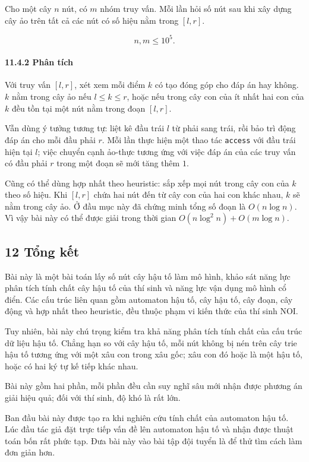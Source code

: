 \documentclass[11pt]{article}
\begin{document}
Cho một cây \(n\) nút, có \(m\) nhóm truy vấn. Mỗi lần hỏi số nút sau khi xây
dựng cây ảo trên tất cả các nút có số hiệu nằm trong \([l,r]\).

\[
  n,m\le 10^5 .
\]

\paragraph{11.4.2 Phân tích}

Với truy vấn \([l,r]\), xét xem mỗi điểm \(k\) có tạo đóng góp cho đáp án hay
không. \(k\) nằm trong cây ảo nếu \(l\le k\le r\), hoặc nếu trong cây con của ít
nhất hai con của \(k\) đều tồn tại một nút nằm trong đoạn \([l,r]\).

Vẫn dùng ý tưởng tương tự: liệt kê đầu trái \(l\) từ phải sang trái, rồi bảo trì
động đáp án cho mỗi đầu phải \(r\). Mỗi lần thực hiện một thao tác
\texttt{access} với đầu trái hiện tại \(l\); việc chuyển cạnh ảo-thực tương ứng
với việc đáp án của các truy vấn có đầu phải \(r\) trong một đoạn sẽ mới tăng
thêm \(1\).

Cũng có thể dùng hợp nhất theo heuristic: sắp xếp mọi nút trong cây con của
\(k\) theo số hiệu. Khi \([l,r]\) chứa hai nút đến từ cây con của hai con khác
nhau, \(k\) sẽ nằm trong cây ảo. Ở đầu mục này đã chứng minh tổng số đoạn là
\(O(n\log n)\). Vì vậy bài này có thể được giải trong thời gian
\(O(n\log^2 n)+O(m\log n)\).

\subsection*{12 Tổng kết}

Bài này là một bài toán lấy số nút cây hậu tố làm mô hình, khảo sát năng lực
phân tích tính chất cây hậu tố của thí sinh và năng lực vận dụng mô hình cổ
điển. Các cấu trúc liên quan gồm automaton hậu tố, cây hậu tố, cây đoạn, cây
động và hợp nhất theo heuristic, đều thuộc phạm vi kiến thức của thí sinh NOI.

Tuy nhiên, bài này chú trọng kiểm tra khả năng phân tích tính chất của cấu trúc
dữ liệu hậu tố. Chẳng hạn so với cây hậu tố, mỗi nút không bị nén trên cây trie
hậu tố tương ứng với một xâu con trong xâu gốc; xâu con đó hoặc là một hậu tố,
hoặc có hai ký tự kế tiếp khác nhau.

Bài này gồm hai phần, mỗi phần đều cần suy nghĩ sâu mới nhận được phương án
giải hiệu quả; đối với thí sinh, độ khó là rất lớn.

Ban đầu bài này được tạo ra khi nghiên cứu tính chất của automaton hậu tố. Lúc
đầu tác giả đặt trực tiếp vấn đề lên automaton hậu tố và nhận được thuật toán
bốn rất phức tạp. Đưa bài này vào bài tập đội tuyển là để thử tìm cách làm đơn
giản hơn.
\end{document}
